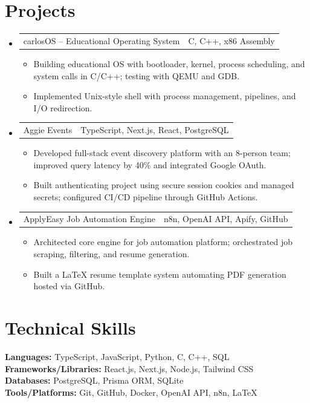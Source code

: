 \documentclass[letterpaper,11pt]{article}
\makeatletter
\newcommand{\resumeItem}[1]{
  \item\small{{#1 \vspace{-2pt}}}
}
\newcommand{\resumeProjectHeading}[2]{
    \item
    \begin{tabular*}{0.97\textwidth}{l@{\extracolsep{\fill}}r}
      \small#1 & #2 \\
    \end{tabular*}\vspace{-7pt}
}
\newcommand{\resumeSubHeadingListStart}{\begin{itemize}[leftmargin=0.15in, label={}]}
\newcommand{\resumeSubHeadingListEnd}{\end{itemize}}
\newcommand{\resumeItemListStart}{\begin{itemize}}
\newcommand{\resumeItemListEnd}{\end{itemize}\vspace{-5pt}}
\makeatother
\begin{document}
\section{Projects}
\resumeSubHeadingListStart
\resumeProjectHeading
{carlosOS -- Educational Operating System}{C, C++, x86 Assembly}
\resumeItemListStart
\resumeItem{Building educational OS with bootloader, kernel, process scheduling, and system calls in C/C++; testing with QEMU and GDB.}
\resumeItem{Implemented Unix-style shell with process management, pipelines, and I/O redirection.}
\resumeItemListEnd

\resumeProjectHeading
{Aggie Events}{TypeScript, Next.js, React, PostgreSQL}
\resumeItemListStart
\resumeItem{Developed full-stack event discovery platform with an 8-person team; improved query latency by 40\% and integrated Google OAuth.}
\resumeItem{Built authenticating project using secure session cookies and managed secrets; configured CI/CD pipeline through GitHub Actions.}
\resumeItemListEnd

\resumeProjectHeading
{ApplyEasy Job Automation Engine}{n8n, OpenAI API, Apify, GitHub}
\resumeItemListStart
\resumeItem{Architected core engine for job automation platform; orchestrated job scraping, filtering, and resume generation.}
\resumeItem{Built a LaTeX resume template system automating PDF generation hosted via GitHub.}
\resumeItemListEnd
\resumeSubHeadingListEnd

\section{Technical Skills}
\begin{itemize}[leftmargin=0.15in, label={}]
  \small{\item{
    \textbf{Languages:} TypeScript, JavaScript, Python, C, C++, SQL \\
    \textbf{Frameworks/Libraries:} React.js, Next.js, Node.js, Tailwind CSS \\
    \textbf{Databases:} PostgreSQL, Prisma ORM, SQLite \\
    \textbf{Tools/Platforms:} Git, GitHub, Docker, OpenAI API, n8n, LaTeX
  }}
\end{itemize}
\end{document}
